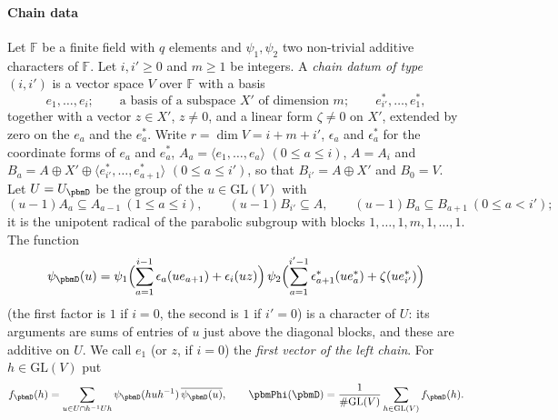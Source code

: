 \documentclass[10pt]{amsart}
\theoremstyle{definition}
\theoremstyle{remark}
\providecommand{\auF}{\mathbb F}
\providecommand{\auGL}{\mathrm{GL}}
\providecommand{\aubar}[1]{\overline{#1}}
\begin{document}
\paragraph*{Chain data}
Let $\auF$ be a finite field with $q$ elements and $\psi_1,\psi_2$ two non-trivial additive
characters of $\auF$. Let $i,i'\ge0$ and $m\ge1$ be integers. A \emph{chain datum of type $(i,i')$}
is a vector space $V$ over $\auF$ with a basis
\[
e_1,\dots,e_i;\qquad\text{a basis of a subspace }X'\text{ of dimension }m;\qquad e^*_{i'},\dots,e^*_1,
\]
together with a vector $z\in X'$, $z\ne0$, and a linear form $\zeta\ne0$ on $X'$, extended by zero
on the $e_a$ and the $e_a^*$. Write $r=\dim V=i+m+i'$, $\epsilon_a$ and $\epsilon_a^*$ for the
coordinate forms of $e_a$ and $e_a^*$, $A_a=\langle e_1,\dots,e_a\rangle$ $(0\le a\le i)$, $A=A_i$
and $B_a=A\oplus X'\oplus\langle e^*_{i'},\dots,e^*_{a+1}\rangle$ $(0\le a\le i')$, so that
$B_{i'}=A\oplus X'$ and $B_0=V$. Let $U=U_\pbmD$ be the group of the $u\in\auGL(V)$ with
\[
(u-1)A_a\subseteq A_{a-1}\ (1\le a\le i),\qquad(u-1)B_{i'}\subseteq A,\qquad(u-1)B_a\subseteq B_{a+1}\
(0\le a<i');
\]
it is the unipotent radical of the parabolic subgroup with blocks $1,\dots,1,m,1,\dots,1$. The
function
\[
\psi_\pbmD(u)=\psi_1\Bigl(\sum_{a=1}^{i-1}\epsilon_a(ue_{a+1})+\epsilon_i(uz)\Bigr)\,\psi_2\Bigl(\sum_{a=1}^{
i'-1}\epsilon^*_{a+1}(ue^*_a)+\zeta(ue^*_{i'})\Bigr)
\]
(the first factor is $1$ if $i=0$, the second is $1$ if $i'=0$) is a character of $U$: its
arguments are sums of entries of $u$ just above the diagonal blocks, and these are additive on
$U$. We call $e_1$ (or $z$, if $i=0$) the \emph{first vector of the left chain}. For $h\in\auGL(V)$
put
\[
f_\pbmD(h)=\sum_{u\in U\cap h^{-1}Uh}\psi_\pbmD(huh^{-1})\,\aubar{\psi_\pbmD(u)},\qquad\pbmPhi(\pbmD)=\frac1{\#
\auGL(V)}\sum_{h\in\auGL(V)}f_\pbmD(h).
\]
\end{document}
